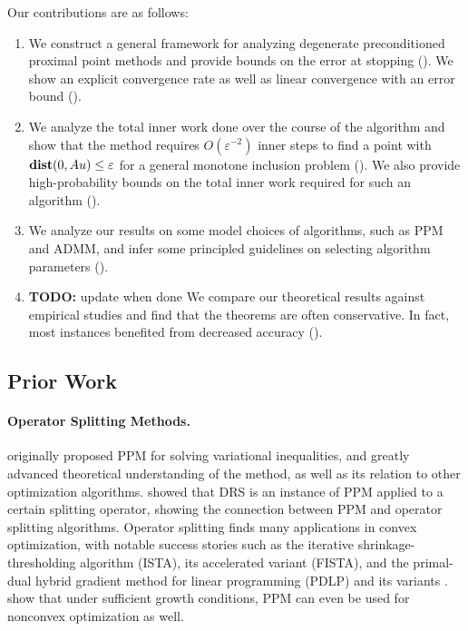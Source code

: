 \documentclass[11pt]{article}
\newcommand{\TODO}[1]{{\color{purple}\textbf{TODO:} #1}}
\begin{document}
Our contributions are as follows:
\begin{enumerate}
    \item We construct a general framework for analyzing degenerate preconditioned proximal point methods and provide bounds on the error at stopping ().
    We show an explicit convergence rate as well as linear convergence with an error bound ().
    \item We analyze the total inner work done over the course of the algorithm and show that the method requires $O(\varepsilon^{-2})$ inner steps to find a point with $\mathop{\bf dist{}}(0,{A} u) \leq\varepsilon$ for a general monotone inclusion problem ().
    We also provide high-probability bounds on the total inner work required for such an algorithm ().
    \item We analyze our results on some model choices of algorithms, such as PPM and ADMM, and infer some principled guidelines on selecting algorithm parameters ().
    \item \TODO{update when done} We compare our theoretical results against empirical studies and find that the theorems are often conservative.
    In fact, most instances benefited from decreased accuracy (). 
\end{enumerate}

\subsection{Prior Work}
\paragraph{Operator Splitting Methods.}
\citet{Martinet1970RegularisationDV} originally proposed PPM for solving variational inequalities, and \citet{rockafellar-ppm-paper,rockafellar1976monotoneoperatorsandppm} greatly advanced theoretical understanding of the method, as well as its relation to other optimization algorithms.
\citet{EcksteinBertsekasDouglasRachfordSplitting} showed that DRS is an instance of PPM applied to a certain splitting operator, showing the connection between PPM and operator splitting algorithms.
Operator splitting finds many applications in convex optimization, with notable success stories such as the iterative shrinkage-thresholding algorithm (ISTA), its accelerated variant (FISTA), and the primal-dual hybrid gradient method for linear programming (PDLP) and its variants \citep{ISTA-original-paper,FISTA-original-paper,applegate2022practicallargescalelinearprogramming-pdlp-paper}.
\citet{liao2026errorboundsplcondition} show that under sufficient growth conditions, PPM can even be used for nonconvex optimization as well.
\end{document}

